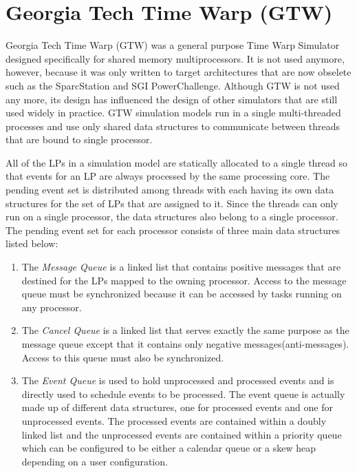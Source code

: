 \documentclass[11pt]{book}
\begin{document}
\section{Georgia Tech Time Warp (GTW)}

Georgia Tech Time Warp \cite{das-94} (GTW) was a general purpose Time Warp Simulator designed
specifically for shared memory multiprocessors.  It is not used anymore, however, because it was
only written to target architectures that are now obselete such as the SparcStation and SGI
PowerChallenge.  Although GTW is not used any more, its design has influenced the design of other
simulators that are still used widely in practice.  GTW simulation models run in a single
multi-threaded processes and use only shared data structures to communicate between threads that are
bound to single processor.

All of the LPs in a simulation model are statically allocated to a single thread so that events for
an LP are always processed by the same processing core.  The pending event set is distributed among
threads with each having its own data structures for the set of LPs that are assigned to it.  Since
the threads can only run on a single processor, the data structures also belong to a single
processor.  The pending event set for each processor consists of three main data structures listed
below\cite{das-94}:

\begin{enumerate}
\item The \emph{Message Queue} is a linked list that contains positive messages that are destined
  for the LPs mapped to the owning processor.  Access to the message queue must be synchronized
  because it can be accessed by tasks running on any processor.
\item The \emph{Cancel Queue} is a linked list that serves exactly the same purpose as the message
  queue except that it contains only negative messages(anti-messages).  Access to this queue must
  also be synchronized.
\item The \emph{Event Queue} is used to hold unprocessed and processed events and is directly used
  to schedule events to be processed.  The event queue is actually made up of different data
  structures, one for processed events and one for unprocessed events.  The processed events are
  contained within a doubly linked list and the unprocessed events are contained within a priority
  queue which can be configured to be either a calendar queue or a skew heap depending on a user
  configuration.
\end{enumerate}
\end{document}
